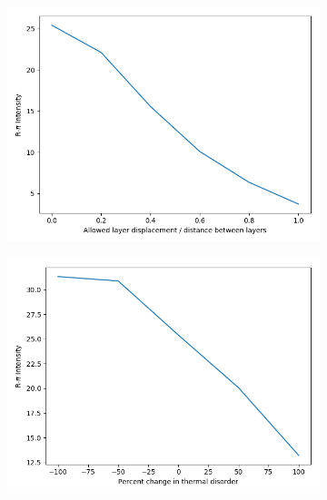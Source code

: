 \documentclass{article}
\begin{document}
  \begin{figure}
  \centering
  \begin{subfigure}{0.45\textwidth} 
  \includegraphics[width=\textwidth]{ld.png}
  \caption{}\label{fig:ld}
  \end{subfigure}
  \begin{subfigure}{0.45\textwidth} 
  \includegraphics[width=\textwidth]{td.png}
  \caption{}\label{fig:td}
  \end{subfigure}
  \begin{subfigure}{0.45\textwidth} 

\end{subfigure}
\end{figure}
\end{document}
